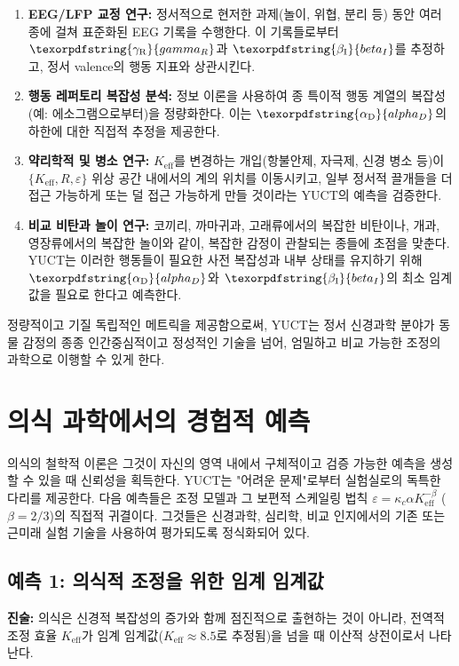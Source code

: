 \documentclass[12pt,a4paper]{article}
\DeclareRobustCommand{\alD}{\texorpdfstring{\ensuremath{\alpha_{\mathrm{D}}}}{alpha_D}}
\DeclareRobustCommand{\beI}{\texorpdfstring{\ensuremath{\beta_{\mathrm{I}}}}{beta_I}}
\DeclareRobustCommand{\gaR}{\texorpdfstring{\ensuremath{\gamma_{\mathrm{R}}}}{gamma_R}}
\begin{document}
	\begin{enumerate}
		\item \textbf{EEG/LFP 교정 연구:} 정서적으로 현저한 과제(놀이, 위협, 분리 등) 동안 여러 종에 걸쳐 표준화된 EEG 기록을 수행한다. 이 기록들로부터 \(\gaR\)과 \(\beI\)를 추정하고, 정서 valence의 행동 지표와 상관시킨다.
		\item \textbf{행동 레퍼토리 복잡성 분석:} 정보 이론을 사용하여 종 특이적 행동 계열의 복잡성(예: 에소그램으로부터)을 정량화한다. 이는 \(\alD\)의 하한에 대한 직접적 추정을 제공한다.
		\item \textbf{약리학적 및 병소 연구:} \(K_{\mathrm{eff}}\)를 변경하는 개입(항불안제, 자극제, 신경 병소 등)이 \(\{K_{\mathrm{eff}}, R, \varepsilon\}\) 위상 공간 내에서의 계의 위치를 이동시키고, 일부 정서적 끌개들을 더 접근 가능하게 또는 덜 접근 가능하게 만들 것이라는 YUCT의 예측을 검증한다.
		\item \textbf{비교 비탄과 놀이 연구:} 코끼리, 까마귀과, 고래류에서의 복잡한 비탄이나, 개과, 영장류에서의 복잡한 놀이와 같이, 복잡한 감정이 관찰되는 종들에 초점을 맞춘다. YUCT는 이러한 행동들이 필요한 사전 복잡성과 내부 상태를 유지하기 위해 \(\alD\)와 \(\beI\)의 최소 임계값을 필요로 한다고 예측한다.
	\end{enumerate}
	
	정량적이고 기질 독립적인 메트릭을 제공함으로써, YUCT는 정서 신경과학 분야가 동물 감정의 종종 인간중심적이고 정성적인 기술을 넘어, 엄밀하고 비교 가능한 조정의 과학으로 이행할 수 있게 한다.
	
	\section{의식 과학에서의 경험적 예측}
	
	의식의 철학적 이론은 그것이 자신의 영역 내에서 구체적이고 검증 가능한 예측을 생성할 수 있을 때 신뢰성을 획득한다. YUCT는 "어려운 문제"로부터 실험실로의 독특한 다리를 제공한다. 다음 예측들은 조정 모델과 그 보편적 스케일링 법칙 \(\varepsilon = \kappa_c \alpha K_{\mathrm{eff}}^{-\beta}\) (\(\beta = 2/3\))의 직접적 귀결이다. 그것들은 신경과학, 심리학, 비교 인지에서의 기존 또는 근미래 실험 기술을 사용하여 평가되도록 정식화되어 있다.
	
	\subsection{예측 1: 의식적 조정을 위한 임계 임계값}
	
	\textbf{진술:} 의식은 신경적 복잡성의 증가와 함께 점진적으로 출현하는 것이 아니라, 전역적 조정 효율 \(K_{\mathrm{eff}}\)가 임계 임계값(\(K_{\mathrm{eff}} \approx 8.5\)로 추정됨)을 넘을 때 이산적 상전이로서 나타난다.
	
\end{document}
